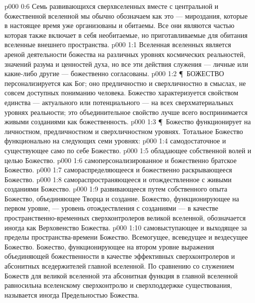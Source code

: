 \vs p000 0:6 Семь развивающихся сверхвселенных вместе с центральной и божественной вселенной мы обычно обозначаем как  это --- мироздания, которые в настоящее время уже организованы и обитаемы. Все они являются частью  которая также включает в себя необитаемые, но приготавливаемые для обитания вселенные внешнего пространства.
\vs p000 1:1 Вселенная вселенных является ареной деятельности божества на различных уровнях космических реальностей, значений разума и ценностей духа, но все эти действия служения --- личные или какие\hyp{}либо другие --- божественно согласованы.
\vs p000 1:2 \P\ БОЖЕСТВО персонализируется как Бог; оно предличностно и сверхличностно в смыслах, не совсем доступных пониманию человека. Божество характеризуется свойством единства --- актуального или потенциального --- на всех сверхматериальных уровнях реальности; это объединительное свойство лучше всего воспринимается живыми созданиями как божественность.
\vs p000 1:3 \P\ Божество функционирует на личностном, предличностном и сверхличностном уровнях. Тотальное Божество функционально на следующих семи уровнях:
\vs p000 1:4 \bibnobreakspace {} самодостаточное и существующее само по себе Божество.
\vs p000 1:5 \bibnobreakspace {} обладающее собственной волей и целью Божество.
\vs p000 1:6 \bibnobreakspace {} самоперсонализированное и божественно братское Божество.
\vs p000 1:7 \bibnobreakspace {} самораспределяющееся и божественно раскрывающееся Божество.
\vs p000 1:8 \bibnobreakspace {} самораспространяющееся и отождествленное с живыми созданиями Божество.
\vs p000 1:9 \bibnobreakspace {} развивающееся путем собственного опыта Божество, объединяющее Творца и создание. Божество, функционирующее на первом уровне, --- уровень отождествления с созданиями --- в качестве пространственно\hyp{}временных сверхконтролеров великой вселенной, обозначается иногда как Верховенство Божества.
\vs p000 1:10 \bibnobreakspace {} самовыступающее и выходящее за пределы пространства\hyp{}времени Божество. Всемогущее, всеведущее и вездесущее Божество. Божество, функционирующее на втором уровне выражения объединяющей божественности в качестве эффективных сверхконтролеров и абсонитных вседержителей главной вселенной. По сравнению со служением Божеств для великой вселенной эта абсонитная функция в главной вселенной равносильна вселенскому сверхконтролю и сверхподдержке существования, называется иногда Предельностью Божества.
